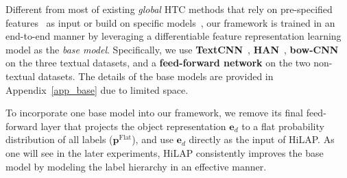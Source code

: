 \documentclass[11pt,a4paper]{article}
\newcommand{\start}[1]{\vspace{1.8mm}\noindent{{\bf #1}}}
\begin{document}
\begin{table}[t]
    \caption{\textbf{Statistics of the datasets.} $|L|$ denotes the number of labels in the label hierarchy. Avg($|L_i|$)  and Max($|L_i|$) denote the average and maximum number of labels of one object, respectively.} 
    \label{table_data}
    \vspace*{-.2cm}
    \centering
\vspace*{-.1cm}
\end{table}

\start{Base Models for Feature Encoding.}
Different from most of existing \textit{global} HTC methods that rely on pre-specified features~\citep{gopal2013recursive} as input or build on specific models~\citep{cai2004hierarchical,vens2008decision,silla2009global}, our framework is trained in an end-to-end manner by leveraging a differentiable feature representation learning model as the \textit{base model}.
Specifically, we use \textbf{TextCNN}~\citep{kim2014convolutional}, \textbf{HAN}~\citep{yang2016hierarchical}, \textbf{bow-CNN}~\citep{johnson2014effective} on the three textual datasets, and a \textbf{feed-forward network} on the two non-textual datasets.
The details of the base models are provided in Appendix~\ref{app_base} due to limited space.

To incorporate one base model into our framework, we remove its final feed-forward layer that projects the object representation $\textbf{e}_d$ to a flat probability distribution of all labels ($\textbf{p}^{\text{Flat}}$), and use $\textbf{e}_d$ directly as the input of HiLAP. As one will see in the later experiments, HiLAP consistently improves the base model by modeling the label hierarchy in an effective manner.
\end{document}
